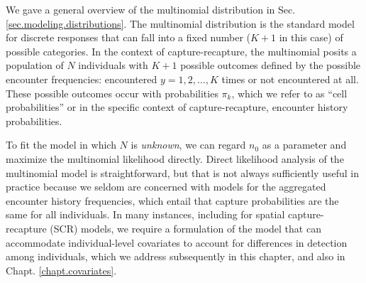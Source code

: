 We gave a general overview of the multinomial distribution in
Sec. \ref{sec.modeling.distributions}. The multinomial distribution is
the standard model for discrete responses that can fall into a fixed
number ($K+1$ in this case) of possible categories. In the context of
capture-recapture, the multinomial posits a population of $N$
individuals with $K+1$ possible outcomes defined by the possible
encounter frequencies: encountered $y=1,2,\ldots,K$ times or not encountered
at all. These possible outcomes occur with
probabilities $\pi_{k}$, which we refer to as ``cell probabilities''
or in the specific context of capture-recapture, encounter history
probabilities.


To fit the model in which $N$ is {\it unknown}, we can regard $n_{0}$ as a
parameter and maximize the multinomial likelihood directly.
Direct likelihood analysis of the multinomial model is
straightforward, but that is not always sufficiently useful in practice
because we seldom are concerned with models for the aggregated
encounter history frequencies, which entail that capture probabilities are the
same for all individuals. In many instances, including for
spatial capture-recapture (SCR) models, we require a formulation of
the model that can accommodate individual-level
covariates to account for
differences in detection among individuals, which we
address subsequently in this chapter, and also in Chapt. \ref{chapt.covariates}.



